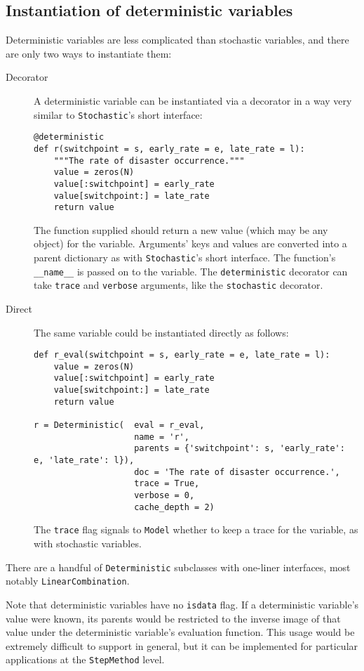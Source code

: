 \subsection{Instantiation of deterministic variables}
Deterministic variables are less complicated than stochastic variables, and there are only two ways to instantiate them:
\begin{description}
    \item[Decorator] A deterministic variable can be instantiated via a decorator in a way very similar to \texttt{Stochastic}'s short interface:
\begin{verbatim}
@deterministic
def r(switchpoint = s, early_rate = e, late_rate = l):
    """The rate of disaster occurrence."""
    value = zeros(N)
    value[:switchpoint] = early_rate
    value[switchpoint:] = late_rate
    return value
\end{verbatim}
The function supplied should return a new value (which may be any object) for the variable. Arguments' keys and values are converted into a parent dictionary as with \texttt{Stochastic}'s short interface. The function's \texttt{__name__} is passed on to the variable. The \texttt{deterministic} decorator can take \texttt{trace} and \texttt{verbose} arguments, like the \texttt{stochastic} decorator.
    \item[Direct] The same variable could be instantiated directly as follows:
\begin{verbatim}
def r_eval(switchpoint = s, early_rate = e, late_rate = l):
    value = zeros(N)
    value[:switchpoint] = early_rate
    value[switchpoint:] = late_rate
    return value

r = Deterministic(  eval = r_eval, 
                    name = 'r',
                    parents = {'switchpoint': s, 'early_rate': e, 'late_rate': l}),
                    doc = 'The rate of disaster occurrence.',
                    trace = True,
                    verbose = 0,
                    cache_depth = 2)
\end{verbatim}
The \texttt{trace} flag signals to \texttt{Model} whether to keep a trace for the variable, as with stochastic variables.
\end{description}

There are a handful of \texttt{Deterministic} subclasses with one-liner interfaces, most notably \texttt{LinearCombination}.

Note that deterministic variables have no \texttt{isdata} flag. If a deterministic variable's value were known, its parents would be restricted to the inverse image of that value under the deterministic variable's evaluation function. This usage would be extremely difficult to support in general, but it can be implemented for particular applications at the \texttt{StepMethod} level.

